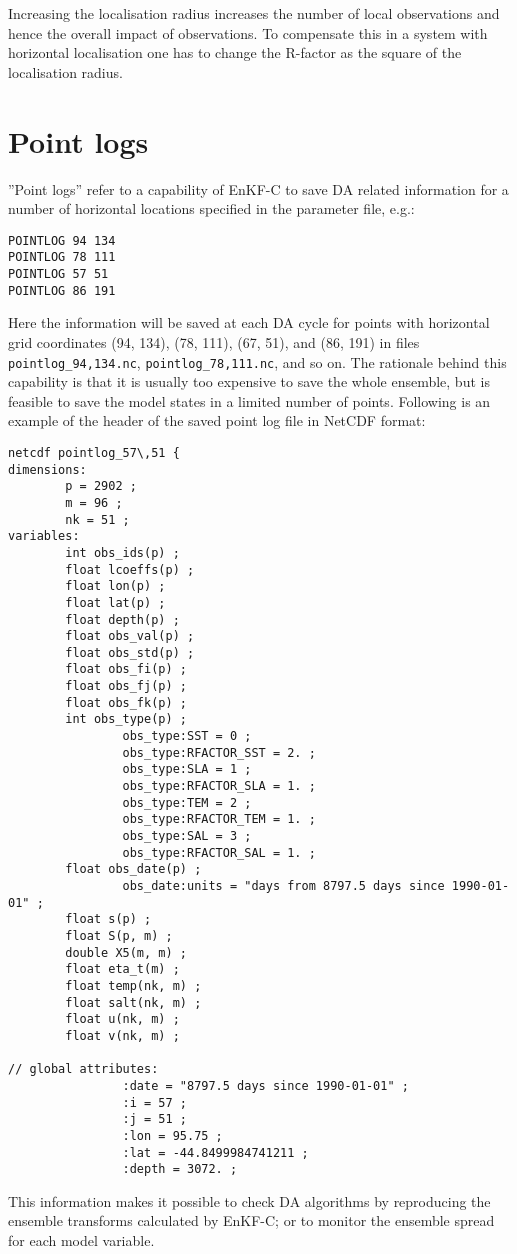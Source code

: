 \documentclass[11pt]{report}
\begin{document}
Increasing the localisation radius increases the number of local observations and hence the overall impact of observations.
To compensate this in a system with horizontal localisation one has to change the R-factor as the square of the localisation radius.

\section{Point logs}

''Point logs'' refer to a capability of EnKF-C to save DA related information for a number of horizontal locations specified in the parameter file, e.g.:
\begin{Verbatim}[frame=single,fontsize=\footnotesize]
POINTLOG 94 134
POINTLOG 78 111
POINTLOG 57 51
POINTLOG 86 191
\end{Verbatim}
Here the information will be saved at each DA cycle for points with horizontal grid coordinates (94, 134), (78, 111), (67, 51), and (86, 191) in files \verb|pointlog_94,134.nc|, \verb|pointlog_78,111.nc|, and so on.
The rationale behind this capability is that it is usually too expensive to save the whole ensemble, but is feasible to save the model states in a limited number of points.
Following is an example of the header of the saved point log file in NetCDF format:
\begin{Verbatim}[frame=single,fontsize=\footnotesize]
netcdf pointlog_57\,51 {
dimensions:
        p = 2902 ;
        m = 96 ;
        nk = 51 ;
variables:
        int obs_ids(p) ;
        float lcoeffs(p) ;
        float lon(p) ;
        float lat(p) ;
        float depth(p) ;
        float obs_val(p) ;
        float obs_std(p) ;
        float obs_fi(p) ;
        float obs_fj(p) ;
        float obs_fk(p) ;
        int obs_type(p) ;
                obs_type:SST = 0 ;
                obs_type:RFACTOR_SST = 2. ;
                obs_type:SLA = 1 ;
                obs_type:RFACTOR_SLA = 1. ;
                obs_type:TEM = 2 ;
                obs_type:RFACTOR_TEM = 1. ;
                obs_type:SAL = 3 ;
                obs_type:RFACTOR_SAL = 1. ;
        float obs_date(p) ;
                obs_date:units = "days from 8797.5 days since 1990-01-01" ;
        float s(p) ;
        float S(p, m) ;
        double X5(m, m) ;
        float eta_t(m) ;
        float temp(nk, m) ;
        float salt(nk, m) ;
        float u(nk, m) ;
        float v(nk, m) ;

// global attributes:
                :date = "8797.5 days since 1990-01-01" ;
                :i = 57 ;
                :j = 51 ;
                :lon = 95.75 ;
                :lat = -44.8499984741211 ;
                :depth = 3072. ;
\end{Verbatim}
This information makes it possible to check DA algorithms by reproducing the ensemble transforms calculated by EnKF-C; or to monitor the ensemble spread for each model variable.
\end{document}

